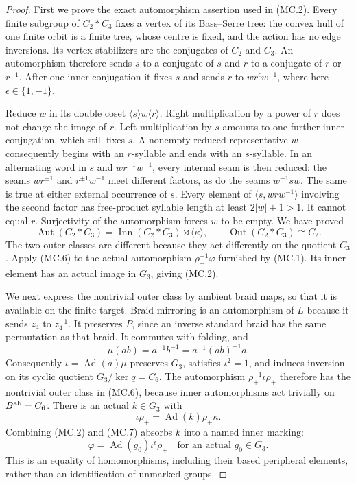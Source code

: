 \begin{proof}
First we prove the exact automorphism assertion used in (MC.2).
Every finite subgroup of $C_2*C_3$ fixes a vertex of its Bass--Serre
tree: the convex hull of one finite orbit is a finite tree, whose
centre is fixed, and the action has no edge inversions.  Its vertex
stabilizers are the conjugates of $C_2$ and $C_3$.  An automorphism
therefore sends $s$ to a conjugate of $s$ and $r$ to a conjugate of
$r$ or $r^{-1}$.  After one inner conjugation it fixes $s$ and sends
$r$ to $w r^\epsilon w^{-1}$, where here $\epsilon\in\{1,-1\}$.

Reduce $w$ in its double coset $\langle s\rangle w\langle r\rangle$.
Right multiplication by a power of $r$ does not change the image of
$r$.  Left multiplication by $s$ amounts to one further inner
conjugation, which still fixes $s$.  A nonempty reduced representative
$w$ consequently begins with an $r$-syllable and ends with an
$s$-syllable.  In an alternating word in $s$ and
$w r^{\pm1}w^{-1}$, every internal seam is then reduced: the seams
$w r^{\pm1}$ and $r^{\pm1}w^{-1}$ meet different factors, as do the
seams $w^{-1}s w$.  The same is true at either external occurrence
of $s$.  Every element of
$\langle s,w r w^{-1}\rangle$ involving the second factor has
free-product syllable length at least $2|w|+1>1$.
It cannot equal $r$.  Surjectivity of the automorphism forces $w$
to be empty.  We have proved
\[
 \operatorname{Aut}(C_2*C_3)
   =\operatorname{Inn}(C_2*C_3)\rtimes\langle\kappa\rangle,
 \qquad \operatorname{Out}(C_2*C_3)\cong C_2.             \tag{MC.6}
\]
The two outer classes are different because they act differently
on the quotient $C_3$.  Apply (MC.6) to the actual automorphism
$\rho_+^{-1}\varphi$ furnished by (MC.1).  Its inner element has
an actual image in $G_3$, giving (MC.2).

We next express the nontrivial outer class by ambient braid maps,
so that it is available on the finite target.  Braid mirroring is
an automorphism of $L$ because it sends $z_4$ to $z_4^{-1}$.
It preserves $P$, since an inverse standard braid has the same
permutation as that braid.  It commutes with folding, and
\[
 \mu(ab)=a^{-1}b^{-1}=a^{-1}(ab)^{-1}a.
\]
Consequently $\iota=\operatorname{Ad}(a)\mu$ preserves $G_3$,
satisfies $\iota^2=1$, and induces inversion on its cyclic quotient
$G_3/\ker q=C_6$.  The automorphism
$\rho_+^{-1}\iota\rho_+$ therefore has the nontrivial outer class
in (MC.6), because inner automorphisms act trivially on $B^{\rm ab}=C_6$.
There is an actual $k\in G_3$ with
\[
 \iota\rho_+=\operatorname{Ad}(k)\rho_+\kappa.           \tag{MC.7}
\]
Combining (MC.2) and (MC.7) absorbs $k$ into a named inner marking:
\[
 \varphi=\operatorname{Ad}(g_0)\iota^\epsilon\rho_+
 \quad\text{for an actual }g_0\in G_3.                  \tag{MC.8}
\]
This is an equality of homomorphisms, including their based
peripheral elements, rather than an identification of unmarked
groups.


\end{proof}
